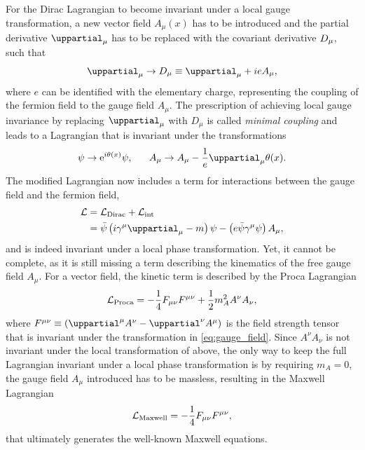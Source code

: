 For the Dirac Lagrangian to become invariant under a local gauge transformation, a new vector field $A_\mu(x)$ has to be introduced and the partial derivative $\uppartial_\mu$ has to be replaced with the covariant derivative $\mathop{}\!D_\mu$, such that
\begin{equation}
	\uppartial_\mu \rightarrow \codiff_\mu \equiv \uppartial_\mu + ieA_\mu,
\end{equation}
where $e$ can be identified with the elementary charge, representing the coupling of the fermion field to the gauge field $A_\mu$. The prescription of achieving local gauge invariance by replacing $\uppartial_\mu$ with $D_\mu$ is called \textit{minimal coupling} and leads to a Lagrangian that is invariant under the transformations
\begin{equation}
	\psi \rightarrow \mathrm{e}^{i\theta\left(x\right)}\psi,\, \, \, \, \, \, \, \, \, \, A_\mu \rightarrow A_\mu - \frac{1}{e}\uppartial_\mu\theta(x).
	\label{eq:gauge_field}
\end{equation}
The modified Lagrangian now includes a term for interactions between the gauge field and the fermion field,
\begin{equation}
\begin{split}
	\Lagr &= \Lagr_\mathrm{Dirac} + \Lagr_\mathrm{int} \\
		&= \bar{\psi}\left(i\gamma^\mu\uppartial_\mu - m\right)\psi - \left(e\bar{\psi}\gamma^\mu\psi\right)A_\mu,
	\label{eq:modified_lagrangian}
\end{split}
\end{equation}
and is indeed invariant under a local phase transformation. Yet, it cannot be complete, as it is still missing a term describing the kinematics of the free gauge field $A_\mu$. For a vector field, the kinetic term is described by the Proca Lagrangian
\begin{equation}
	\mathcal{L}_\mathrm{Proca} = -\frac{1}{4}F_{\mu\nu}F^{\mu\nu} + \frac{1}{2}m_A^2A^\nu A_\nu,
\end{equation}
where $F^{\mu\nu}\equiv\left(\uppartial^\mu A^\nu-\uppartial^\nu A^\mu\right)$ is the field strength tensor that is invariant under the transformation in \cref{eq:gauge_field}. Since $A^\nu A_\nu$ is not invariant under the local transformation of above, the only way to keep the full Lagrangian invariant under a local phase transformation is by requiring $m_A=0$, \ie the gauge field $A_\mu$ introduced has to be massless, resulting in the Maxwell Lagrangian
\begin{equation}
	\mathcal{L}_\mathrm{Maxwell} = -\frac{1}{4}F_{\mu\nu}F^{\mu\nu},
\end{equation}
that ultimately generates the well-known Maxwell equations.

